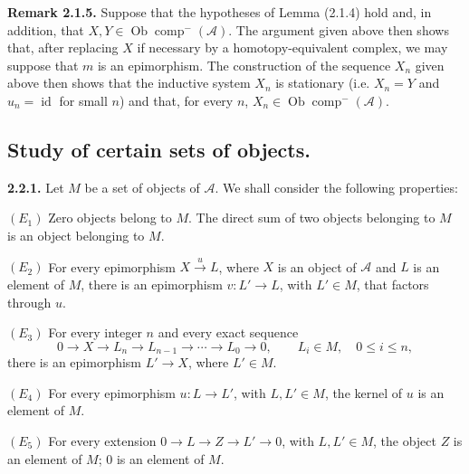 \clearpage
{}%
\begingroup\small\setlength{\parskip}{0pt}\setlength{\emergencystretch}{1.5em}
\setlength{\abovedisplayskip}{4pt plus 2pt minus 2pt}%
\setlength{\belowdisplayskip}{4pt plus 2pt minus 2pt}%

\noindent\textbf{Remark 2.1.5.}\quad
Suppose that the hypotheses of Lemma (2.1.4) hold and, in addition, that
$X,Y\in\operatorname{Ob}\operatorname{comp}^{-}(\mathcal A)$. The argument
given above then shows that, after replacing $X$ if necessary by a
homotopy-equivalent complex, we may suppose that $m$ is an epimorphism.
The construction of the sequence $X_n$ given above then shows that the
inductive system $X_n$ is stationary (i.e. $X_n=Y$ and
$u_n=\operatorname{id}$ for small $n$) and that, for every $n$,
$X_n\in\operatorname{Ob}\operatorname{comp}^{-}(\mathcal A)$.

\subsection{Study of certain sets of objects.}

\noindent\textbf{2.2.1.}\quad
Let $M$ be a set of objects of $\mathcal A$. We shall consider the following
properties:

\noindent$(E_1)$ Zero objects belong to $M$. The direct sum of two objects
belonging to $M$ is an object belonging to $M$.

\noindent$(E_2)$ For every epimorphism $X\xrightarrow{u}L$, where $X$ is
an object of $\mathcal A$ and $L$ is an element of $M$, there is an
epimorphism $v\colon L'\longrightarrow L$, with $L'\in M$, that factors
through $u$.

\noindent$(E_3)$ For every integer $n$ and every exact sequence
\[
0\longrightarrow X\longrightarrow L_n\longrightarrow L_{n-1}
\longrightarrow\cdots\longrightarrow L_0\longrightarrow0,
\qquad L_i\in M,\quad0\leq i\leq n,
\]
there is an epimorphism $L'\longrightarrow X$, where $L'\in M$.

\noindent$(E_4)$ For every epimorphism
$u\colon L\longrightarrow L'$, with $L,L'\in M$, the kernel of $u$ is an
element of $M$.

\noindent$(E_5)$ For every extension
$0\longrightarrow L\longrightarrow Z\longrightarrow L'\longrightarrow0$,
with $L,L'\in M$, the object $Z$ is an element of $M$; $0$ is an element
of $M$.

